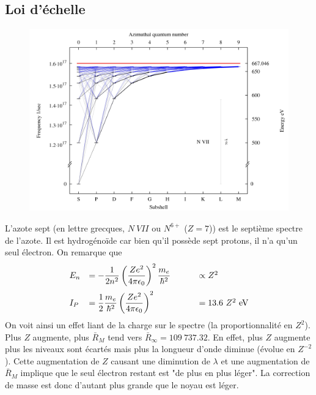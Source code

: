 \subsection{Loi d'échelle}
	\begin{figure}
	\vspace{-8mm}
	\includegraphics[scale=0.35]{ch1/image7}
	\end{figure}
L'azote sept (en lettre grecques, $N\ VII$ ou $N^{6+}$ ($Z=7$)) est le septième spectre de l'azote. Il
est hydrogénoïde car bien qu'il possède sept protons, il n'a qu'un seul électron. On remarque que 
\begin{equation}
\begin{array}{lll}
E_n &=\DS -\frac{1}{2n^2}\left(\frac{Ze^2}{4\pi\epsilon_0}\right)^2\frac{m_e}{\hbar^2}\qquad \ &\propto
 Z^2\vspace{2mm}\\
I_P &=\DS \frac{1}{2}\frac{m_e}{\hbar^2}\left(\frac{Ze^2}{4\pi\epsilon_0}\right)^2 &=13.6\ Z^2\ \text{eV}
\end{array}
\end{equation}
On voit ainsi un effet liant de la charge sur le spectre (la proportionnalité en $Z^2$). Plus $Z$ augmente, 
plus $\bar R_M$ tend vers $\bar R_\infty = 109\ 737.32$. En effet, plus $Z$ augmente plus les niveaux sont
écartés mais plus la longueur d'onde diminue (évolue en $Z^{-2}$). Cette augmentation de $Z$ causant une 
diminution de $\lambda$ et une augmentation de $\bar R_M$ implique que le seul électron restant est 
"de plus en plus léger". La correction de masse est donc d'autant plus grande que le noyau est léger.\\

